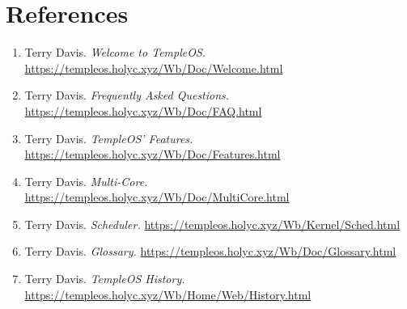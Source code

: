 \documentclass[11pt]{article}
\begin{document}
\section{References}
\label{sec:org08dcc01}

\begin{enumerate}
\item Terry Davis. \emph{Welcome to TempleOS.}
\url{https://templeos.holyc.xyz/Wb/Doc/Welcome.html}

\item Terry Davis. \emph{Frequently Asked Questions.}
\url{https://templeos.holyc.xyz/Wb/Doc/FAQ.html}

\item Terry Davis. \emph{TempleOS' Features.}
\url{https://templeos.holyc.xyz/Wb/Doc/Features.html}

\item Terry Davis. \emph{Multi-Core.}
\url{https://templeos.holyc.xyz/Wb/Doc/MultiCore.html}

\item Terry Davis. \emph{Scheduler.}
\url{https://templeos.holyc.xyz/Wb/Kernel/Sched.html}

\item Terry Davis. \emph{Glossary.}
\url{https://templeos.holyc.xyz/Wb/Doc/Glossary.html}

\item Terry Davis. \emph{TempleOS History.}
\url{https://templeos.holyc.xyz/Wb/Home/Web/History.html}
\end{enumerate}
\end{document}
